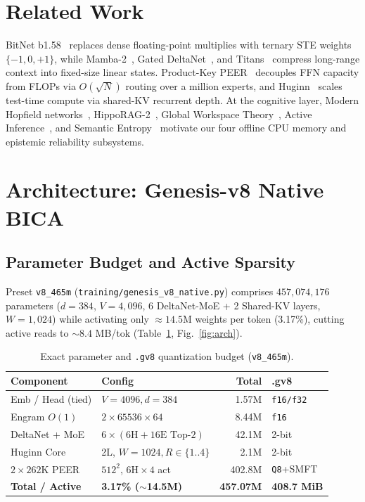 \documentclass[10pt,twocolumn,letterpaper]{article}
\begin{document}
\section{Related Work}
BitNet b1.58~\cite{ma2024era} replaces dense floating-point multiplies with ternary STE weights $\{-1,0,+1\}$, while Mamba-2~\cite{dao2024transformers}, Gated DeltaNet~\cite{yang2025gated}, and Titans~\cite{behrouz2024titans} compress long-range context into fixed-size linear states. Product-Key PEER~\cite{he2024mixture} decouples FFN capacity from FLOPs via $O(\sqrt{N})$ routing over a million experts, and Huginn~\cite{geiping2025scaling} scales test-time compute via shared-KV recurrent depth. At the cognitive layer, Modern Hopfield networks~\cite{ramsauer2021hopfield}, HippoRAG-2~\cite{gutierrez2025from}, Global Workspace Theory~\cite{dehaene2011experimental}, Active Inference~\cite{friston2017active}, and Semantic Entropy~\cite{farquhar2024detecting} motivate our four offline CPU memory and epistemic reliability subsystems.

\section{Architecture: Genesis-v8 Native BICA}
\subsection{Parameter Budget and Active Sparsity}
Preset \texttt{v8\_465m} (\texttt{training/genesis\_v8\_native.py}) comprises $457{,}074{,}176$ parameters ($d=384$, $V=4{,}096$, 6 DeltaNet-MoE + 2 Shared-KV layers, $W=1{,}024$) while activating only $\approx 14.5$M weights per token (3.17\%), cutting active reads to $\sim 8.4$ MB/tok (Table~\ref{tab:params}, Fig.~\ref{fig:arch}).

\begin{table}[t]
\centering
\caption{Exact parameter and \texttt{.gv8} quantization budget (\texttt{v8\_465m}).}
\label{tab:params}
\footnotesize
\begin{tabular}{@{}llrl@{}}
\toprule
\textbf{Component} & \textbf{Config} & \textbf{Total} & \textbf{.gv8} \\
\midrule
Emb / Head (tied) & $V=4096, d=384$ & 1.57M & \texttt{f16/f32} \\
Engram $O(1)$ & $2\times 65536\times 64$ & 8.44M & \texttt{f16} \\
DeltaNet + MoE & $6\times(6\text{H}+16\text{E Top-2})$ & 42.1M & 2-bit \\
Huginn Core & 2L, $W=1024, R\in\{1..4\}$ & 2.1M & 2-bit \\
$2\times 262$K PEER & $512^2$, $6\text{H}\times 4$ act & 402.8M & \texttt{Q8}+SMFT \\
\midrule
\textbf{Total / Active} & \textbf{3.17\% ($\sim$14.5M)} & \textbf{457.07M} & \textbf{408.7 MiB} \\
\bottomrule
\end{tabular}
\end{table}
\end{document}
